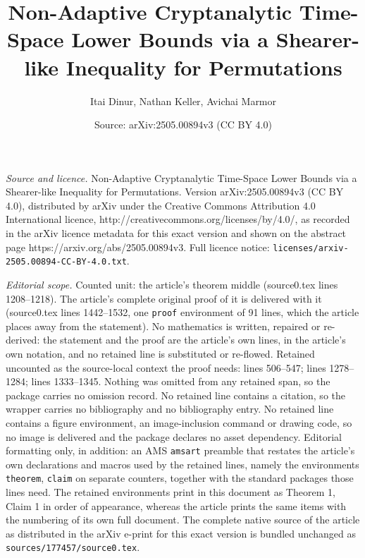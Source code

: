 \documentclass[10pt,a4paper]{amsart}
\title{Non-Adaptive Cryptanalytic Time-Space Lower Bounds via a Shearer-like Inequality for Permutations}
\author{Itai Dinur, Nathan Keller, Avichai Marmor}
\date{Source: arXiv:2505.00894v3 (CC BY 4.0)}
\begin{document}
\maketitle

\noindent\emph{Source and licence.} Non-Adaptive Cryptanalytic Time-Space Lower Bounds via a Shearer-like Inequality for Permutations. Version arXiv:2505.00894v3 (CC BY 4.0), distributed by arXiv under the Creative Commons Attribution 4.0 International licence, http://creativecommons.org/licenses/by/4.0/, as recorded in the arXiv licence metadata for this exact version and shown on the abstract page https://arxiv.org/abs/2505.00894v3. Full licence notice: \texttt{licenses/arxiv-2505.00894-CC-BY-4.0.txt}.\par\smallskip

\noindent\textit{Editorial scope.} Counted unit: the article's theorem middle (source0.tex lines 1208--1218). The article's complete original proof of it is delivered with it (source0.tex lines 1442--1532, one \texttt{proof} environment of 91 lines, which the article places away from the statement). No mathematics is written, repaired or re-derived: the statement and the proof are the article's own lines, in the article's own notation, and no retained line is substituted or re-flowed.  Retained uncounted as the source-local context the proof needs: lines 506--547; lines 1278--1284; lines 1333--1345.  Nothing was omitted from any retained span, so the package carries no omission record.  No retained line contains a citation, so the wrapper carries no bibliography and no bibliography entry.  No retained line contains a figure environment, an image-inclusion command or drawing code, so no image is delivered and the package declares no asset dependency.  Editorial formatting only, in addition: an AMS \texttt{amsart} preamble that restates the article's own declarations and macros used by the retained lines, namely the environments \texttt{theorem}, \texttt{claim} on separate counters, together with the standard packages those lines need.  The retained environments print in this document as Theorem 1, Claim 1 in order of appearance, whereas the article prints the same items with the numbering of its own full document.  The complete native source of the article as distributed in the arXiv e-print for this exact version is bundled unchanged as \texttt{sources/177457/source0.tex}.
\end{document}
